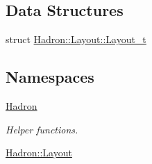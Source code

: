 \subsection*{Data Structures}
\begin{DoxyCompactItemize}
\item 
struct \mbox{\hyperlink{structHadron_1_1Layout_1_1Layout__t}{Hadron\+::\+Layout\+::\+Layout\+\_\+t}}
\end{DoxyCompactItemize}
\subsection*{Namespaces}
\begin{DoxyCompactItemize}
\item 
 \mbox{\hyperlink{namespaceHadron}{Hadron}}
\begin{DoxyCompactList}\small\item\em Helper functions. \end{DoxyCompactList}\item 
 \mbox{\hyperlink{namespaceHadron_1_1Layout}{Hadron\+::\+Layout}}
\end{DoxyCompactItemize}
